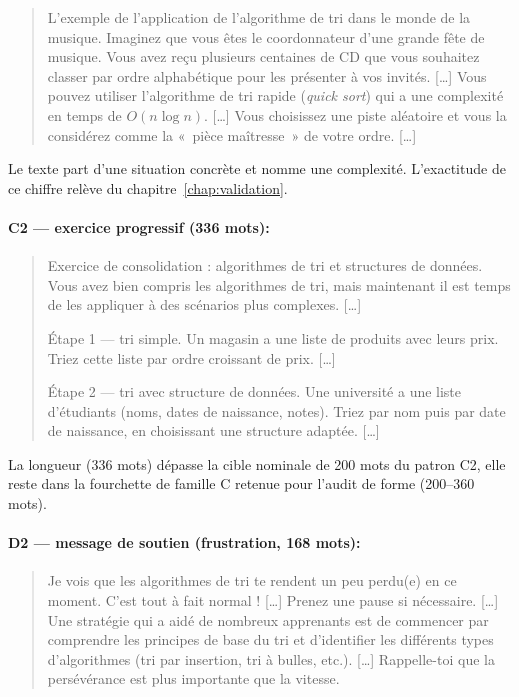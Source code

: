 \begin{quote}
\small
L'exemple de l'application de l'algorithme de tri dans le monde
de la musique. Imaginez que vous êtes le coordonnateur d'une grande
fête de musique. Vous avez reçu plusieurs centaines de CD que vous
souhaitez classer par ordre alphabétique pour les présenter à vos
invités. [\ldots] Vous pouvez utiliser l'algorithme de tri rapide
(\emph{quick sort}) qui a une complexité en temps de $O(n\log n)$.
[\ldots] Vous choisissez une piste aléatoire et vous la considérez comme
la «~pièce maîtresse~» de votre ordre. [\ldots]
\end{quote}

Le texte part d'une situation concrète et nomme une complexité.
L'exactitude de ce chiffre relève du chapitre~\ref{chap:validation}.

\paragraph{C2 --- exercice progressif (336 mots):}

\begin{quote}
\small
Exercice de consolidation : algorithmes de tri et structures de
données. Vous avez bien compris les algorithmes de tri, mais maintenant
il est temps de les appliquer à des scénarios plus complexes. [\ldots]

Étape 1 --- tri simple. Un magasin a une liste de produits avec
leurs prix. Triez cette liste par ordre croissant de prix. [\ldots]

Étape 2 --- tri avec structure de données. Une université a une
liste d'étudiants (noms, dates de naissance, notes). Triez par nom puis
par date de naissance, en choisissant une structure adaptée. [\ldots]
\end{quote}

La longueur (336 mots) dépasse la cible nominale de 200 mots du patron
C2, elle reste dans la fourchette de famille C retenue pour l'audit de
forme (200--360 mots).

\paragraph{D2 --- message de soutien (frustration, 168 mots):}
\label{subsec:exemple-d2}
\label{sec:annexe-hallucination}

\begin{quote}
\small
Je vois que les algorithmes de tri te rendent un peu perdu(e) en ce
moment. C'est tout à fait normal ! [\ldots] Prenez une pause si
nécessaire. [\ldots] Une stratégie qui a aidé de nombreux apprenants est
de commencer par comprendre les principes de base du tri et d'identifier
les différents types d'algorithmes (tri par insertion, tri à bulles,
etc.). [\ldots] Rappelle-toi que la persévérance est plus importante que
la vitesse.
\end{quote}


